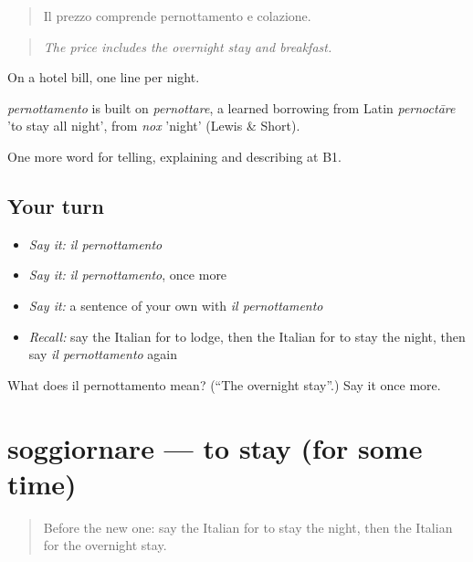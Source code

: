 \begin{quote}
Il prezzo comprende pernottamento e colazione.
\end{quote}

\begin{quote}
\emph{The price includes the overnight stay and breakfast.}
\end{quote}

On a hotel bill, one line per night.

\begin{cousinweb}
\emph{pernottamento} is built on \emph{pernottare}, a learned borrowing from Latin \emph{pernoctāre} 'to stay all night', from \emph{nox} 'night' (Lewis \& Short).
\end{cousinweb}

\begin{grammarlens}[title={What you've built}]
One more word for telling, explaining and describing at B1.
\end{grammarlens}

\subsection*{Your turn}
\begin{itemize}
\raggedright
  \item \emph{Say it:} \emph{il pernottamento}
  \item \emph{Say it:} \emph{il pernottamento}, once more
  \item \emph{Say it:} a sentence of your own with \emph{il pernottamento}
  \item \emph{Recall:} say the Italian for to lodge, then the Italian for to stay the night, then say \emph{il pernottamento} again
\end{itemize}

\begin{tcolorbox}[breakable,colback=teal!4,colframe=teal!35!black,title={Before you move on}]
What does il pernottamento mean? (\textquotedblleft{}The overnight stay\textquotedblright{}.) Say it once more.
\end{tcolorbox}
\section[soggiornare]{soggiornare — to stay (for some time)}

\label{lesson:IT-C432-soggiornare}



\begin{quote}
Before the new one: say the Italian for to stay the night, then the Italian for the overnight stay.
\end{quote}

